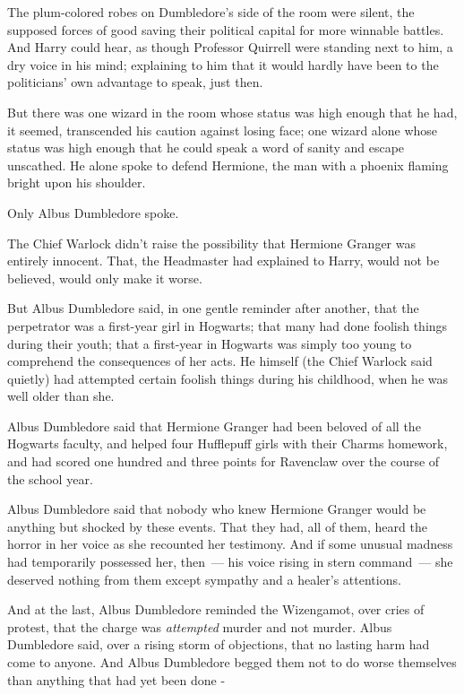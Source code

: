 The plum-colored robes on Dumbledore's side of the room were silent, the supposed forces of good saving their political capital for more winnable battles. And Harry could hear, as though Professor Quirrell were standing next to him, a dry voice in his mind; explaining to him that it would hardly have been to the politicians' own advantage to speak, just then.

But there was one wizard in the room whose status was high enough that he had, it seemed, transcended his caution against losing face; one wizard alone whose status was high enough that he could speak a word of sanity and escape unscathed. He alone spoke to defend Hermione, the man with a phoenix flaming bright upon his shoulder.

Only Albus Dumbledore spoke.

The Chief Warlock didn't raise the possibility that Hermione Granger was entirely innocent. That, the Headmaster had explained to Harry, would not be believed, would only make it worse.

But Albus Dumbledore said, in one gentle reminder after another, that the perpetrator was a first-year girl in Hogwarts; that many had done foolish things during their youth; that a first-year in Hogwarts was simply too young to comprehend the consequences of her acts. He himself (the Chief Warlock said quietly) had attempted certain foolish things during his childhood, when he was well older than she.

Albus Dumbledore said that Hermione Granger had been beloved of all the Hogwarts faculty, and helped four Hufflepuff girls with their Charms homework, and had scored one hundred and three points for Ravenclaw over the course of the school year.

Albus Dumbledore said that nobody who knew Hermione Granger would be anything but shocked by these events. That they had, all of them, heard the horror in her voice as she recounted her testimony. And if some unusual madness had temporarily possessed her, then~--- his voice rising in stern command~--- she deserved nothing from them except sympathy and a healer's attentions.

And at the last, Albus Dumbledore reminded the Wizengamot, over cries of protest, that the charge was \emph{attempted} murder and not murder. Albus Dumbledore said, over a rising storm of objections, that no lasting harm had come to anyone. And Albus Dumbledore begged them not to do worse themselves than anything that had yet been done -


